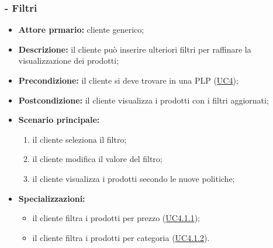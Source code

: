 \subsubsection{ - Filtri}
\begin{itemize}
    \item \textbf{Attore prmario:} cliente generico;
    \item \textbf{Descrizione:} il cliente può inserire ulteriori filtri per raffinare la visualizzazione dei prodotti;
    \item \textbf{Precondizione:} il cliente si deve trovare in una PLP (\hyperref[UC4]{UC4});
    \item \textbf{Postcondizione:} il cliente visualizza i prodotti con i filtri aggiornati;
    \item \textbf{Scenario principale:}
          \begin{enumerate}
              \item il cliente seleziona il filtro;
              \item il cliente modifica il valore del filtro;
              \item il cliente visualizza i prodotti secondo le nuove politiche;
          \end{enumerate}
    \item \textbf{Specializzazioni: }
          \begin{itemize}
              \item il cliente filtra i prodotti per prezzo (\hyperref[UC4.1.1]{UC4.1.1});
              \item il cliente filtra i prodotti per categoria (\hyperref[UC4.1.2]{UC4.1.2}).
          \end{itemize}
\end{itemize}

\stepsubsubUserCase
